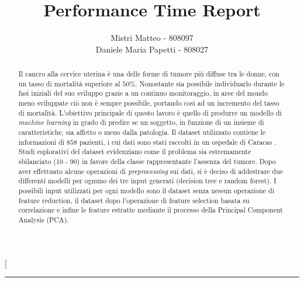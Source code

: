 \documentclass[a4paper, 12pt, conference]{ieeeconf}
\title{\LARGE \bf
Performance Time Report
}
\author{Mistri Matteo - 808097\\
	Daniele Maria Papetti - 808027
}
\begin{document}
\twocolumn[
\begin{@twocolumnfalse} 
\maketitle
\thispagestyle{empty}
\pagestyle{empty}
\rule{\textwidth}{.5pt}
\begin{abstract}

Il cancro alla cervice uterina è una delle forme di tumore più diffuse tra le donne, con un tasso di mortalità superiore al $50\%$.
Nonostante sia possibile individuarlo durante le fasi iniziali del suo sviluppo grazie a un continuo monitoraggio, in aree del mondo meno sviluppate ciò non è sempre possibile, portando così ad un incremento del tasso di mortalità.
L'obiettivo principale di questo lavoro è quello di produrre un modello di \textit{machine learning} in grado di predire se un soggetto, in funzione di un insieme di caratteristiche, sia affetto o meno dalla patologia.
Il dataset utilizzato contiene le informazioni di $858$ pazienti, i cui dati sono stati raccolti in un ospedale di Caracas \cite{ML}.
Studi esplorativi del dataset evidenziano come il problema sia estremamente sbilanciato (10 - 90) in favore della classe rappresentante l'assenza del tumore.
Dopo aver effettuato alcune operazioni di \textit{preprocessing} sui dati, si è deciso di addestrare due differenti modelli per ognuno dei tre input generati (decision tree e random forest).
I possibili input utilizzati per ogni modello sono il dataset senza nessun operazione di feature reduction, il dataset dopo l'operazione di feature selection basata su correlazione e infine le feature estratte mediante il processo della Principal Component Analysis (PCA).

\end{abstract}
\end{@twocolumnfalse}
\end{document}
